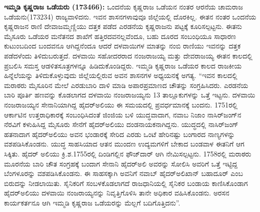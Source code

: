 \textbf{ಇಮ್ಮಡಿ ಕೃಷ್ಣರಾಜ ಒಡೆಯರು (1734\general{\enginline{-}}66): } ಒಂದನೆಯ ಕೃಷ್ಣರಾಜ ಒಡೆಯನ ನಂತರ ಆರನೆಯ ಚಾಮರಾಜ ಒಡೆಯನು(1732\enginline{-}34) ರಾಜ್ಯವಾಳಿದನು. ಇವನ ಶಾಸನಗಳಾವುವೂ ಜಿಲ್ಲೆಯಲ್ಲಿ ದೊರಕಿಲ್ಲ. ಈತನ ನಂತರ ಒಂದನೆಯ ಕೃಷ್ಣರಾಜನ ರಾಣಿ ದೇವಾಜಮ್ಮಣ್ಣಿಯು ದತ್ತಕ ಪಡೆದ ಎರಡನೆಯ ಕೃಷ್ಣರಾಜನು ಪಟ್ಟಕ್ಕೆ ಕೂರಿಸಲ್ಪಟ್ಟನು. ಈತನು ಮೈಸೂರು ಒಡೆಯರ ಮನೆತನದ ಶಾಖೆಗೆ ಹತ್ತಿರದವನಲ್ಲವೆಂದೂ, ಬಹು ದೂರದ ಸಂಬಂಧಿಯೂ ಸಾಧಾರಣ ಕುಟುಂಬದಿಂದ ಬಂದವನೂ ಆಗಿದ್ದನೆಂದೂ ಆದರೆ ದಳವಾಯಿಗಳ ಮಾತನ್ನು ನಂಬಿ ರಾಣಿಯು ಇವನನ್ನು ದತ್ತಕ ಪಡೆದಳೆಂದು ತಿಳಿದುಬರುತ್ತದೆ. ದಳವಾಯಿ ಸಹೋದರರಾದ ನಂಜರಾಜಯ್ಯ ಮತ್ತು ದೇವರಾಜಯ್ಯ ಈತನ ಕಾಲದಲ್ಲಿ ಪ್ರಬಲಿಸಿ ಸಮಸ್ತ ಆಡಳಿತಸೂತ್ರಗಳನ್ನೂ ಹಿಡಿದುಕೊಂಡಿದ್ದರು. ಇಮ್ಮಡಿ ಕೃಷ್ಣರಾಜ ಒಡೆಯರ ಕಾಲದ ರಾಜಕೀಯ ಹಿನ್ನೆಲೆಯನ್ನು ತಿಳಿದುಕೊಳ್ಳುವುದು ಜಿಲ್ಲೆಯಲ್ಲಿರುವ ಅವನ ಶಾಸನಗಳ ಅಧ್ಯಯನಕ್ಕೆ ಅಗತ್ಯ. “ಇವನ ಕಾಲದಲ್ಲಿ ಮರಾಠರು ಮೈಸೂರಿನ ಮೇಲೆ ಎರಡುಬಾರಿ ದಾಳಿ ಮಾಡಿ ಅಪಾರಪ್ರಮಾಣದ ಚೌತನ್ನು ಸಂಗ್ರಹಿಸಿದರು. ಎರಡನೆಯ ಬಾರಿ ಪೂರ್ತಿ ಹಣವನ್ನು ಕೊಡಲಾಗದ ದಳವಾಯಿ ನಂಜರಾಜಯ್ಯನು 13 ತಾಲ್ಲೂಕುಗಳನ್ನು ಒತ್ತೆ ಇಟ್ಟನು. ದಳವಾಯಿ ನಂಜರಾಜಯ್ಯನ ಸೇನಾನಿಯಾಗಿದ್ದ ಹೈದರ್​ಅಲಿಯು ಈ ಸಮಯದಲ್ಲಿ ಪ್ರವರ್ಧಮಾನಕ್ಕೆ ಬಂದನು. 1751ರಲ್ಲಿ ಆರ್ಕಾಟಿನ ಉತ್ತರಾಧಿಕಾರಕ್ಕೆ ಸಂಬಂಧಿಸಿದಂತೆ ಜಿಂಜಿಯ ಬಳಿ ಯುದ್ಧವಾದಾಗ, ನವಾಬ ನಿಜಾಂ ನಾಸಿರ್​ಜಂಗ್​ನ ನೆರವಿಗೆ ಕಳುಹಿಸಿದ್ದ ಮೈಸೂರು ಸೇನೆಗೆ ಹೈದರ್​ಅಲಿಯು ದಂಡನಾಯಕನಾಗಿದ್ದನು. ಯುದ್ಧದಲ್ಲಿ ನಾಸಿರ್​ಜಂಗ್​ ಹತನಾದಾಗ ಹೈದರ್​ಅಲಿಯು ಅವನ ಭಂಡಾರಕ್ಕೆ ಸೇರಿದ ಎರಡು ಒಂಟೆ ಹೇರಿನಷ್ಟು ಬಂಗಾರದ ನಾಣ್ಯಗಳನ್ನು ವಶಪಡಿಸಿಕೊಂಡನು. ಯುದ್ಧ ಸಾಹಸಿಯಾದ ಆತನ ಮುಂದಣ ಉದ್ಯಮಗಳಿಗೆ ಬೇಕಾದ ಬಂಡವಾಳ ಈತನಿಗೆ ಆಗ ಸಿಕ್ಕಿತು. ಹೈದರ್​ ಅಲಿಯು ಕ್ರಿ.ಶ.1755ರಲ್ಲಿ ದಿಂಡಿಗಲ್ಲಿನ ಫೌಜ್​ದಾರ್​ ಆಗಿ ನೇಮಿಸಲ್ಪಟ್ಟನು. 1758ರಲ್ಲಿ ಮರಾಠರು ಮೂರನೆಯ ಬಾರಿ ಚೌತ ಸಂಗ್ರಹಕ್ಕೆ ಬಂದಾಗ ಸೇನಾನಿ ಹೈದರ್​ಅಲಿ ಅವರನ್ನು ಸೋಲಿಸಿ ಅವರಿಗೆ ಒತ್ತೆ ಇಟ್ಟಿದ್ದ ಬೆಂಗಳೂರನ್ನು ವಶಪಡಿಸಿಕೊಂಡನು. ಈ ಸಾಹಸಕ್ಕಾಗಿ ಅವನಿಗೆ ನವಾಬ್​ ಹೈದರ್​ಅಲಿಖಾನ್​ ಬಹಾದೂರ್​ ಎಂಬ ಬಿರುದನ್ನು ನೀಡಲಾಯಿತು. ಸೈನಿಕರಿಗೆ ಸಂಬಳಕೊಡಲಾಗದೆ ರಾಜಧಾನಿಯಲ್ಲಿ ಸೈನಿಕರ ಬಂಡಾಯ ಕಾಣಿಸಿಕೊಂಡಾಗ ಹೈದರ್​ಅಲಿಯು ದಳವಾಯಿ ನಂಜರಾಯ್ಯನನ್ನು ನಿವೃತ್ತಿಗೊಳಿಸಿ ತಾನೇ ಅಧಿಕಾರ ವಹಿಸಿಕೊಂಡನು. ಅರಸನ ಕಾರ್ಯಕರ್ತನೂ ಆಗಿ ಇಮ್ಮಡಿ ಕೃಷ್ಣರಾಜ ಒಡೆಯರನ್ನು ಮೆಲ್ಲಗೆ ಬದಿಗೊತ್ತಿದನು”.

